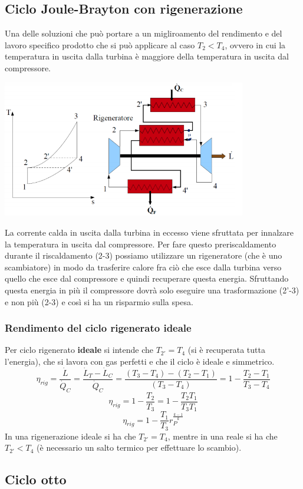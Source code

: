 \subsection{Ciclo Joule-Brayton con rigenerazione}
Una delle soluzioni che può portare a un migliroamento del rendimento e del lavoro specifico prodotto che si può applicare al caso $T_2<T_4$, ovvero in cui la temperatura in uscita dalla turbina è maggiore della temperatura in uscita dal compressore.
\begin{center}
    \includegraphics[height=6cm]{../L07/img8.PNG}
\end{center}
La corrente calda in uscita dalla turbina in eccesso viene sfruttata per innalzare la temperatura in uscita dal compressore.\newline
\newline
Per fare questo preriscaldamento durante il riscaldamento (2-3) possiamo utilizzare un rigeneratore (che è uno scambiatore) in modo da trasferire calore fra ciò che esce dalla turbina verso quello che esce dal compressore e quindi recuperare questa energia. Sfruttando questa energia in più il compressore dovrà solo eseguire una trasformazione (2'-3) e non più (2-3) e così si ha un risparmio sulla spesa.\newline
\newline
\subsubsection{Rendimento del ciclo rigenerato ideale}
Per ciclo rigenerato \textbf{ideale} si intende che $T_{2'} = T_4$ (si è recuperata tutta l'energia), che si lavora con gas perfetti e che il ciclo è ideale e simmetrico.
\[
    \eta_{rig} = \frac{\dot{L}}{\dot{Q}_C} = \frac{\dot{L}_T - \dot{L}_C}{\dot{Q}_C} = \frac{(T_3-T_4)-(T_2-T_1)}{(T_3-T_4)} = 1- \frac{T_2-T_1}{T_3-T_4}
\]
\[
    \eta_{rig} = 1- \frac{T_2}{T_3} = 1- \frac{T_2 T_1}{T_3T_1}
\]
\[
    \eta_{rig} = 1- \frac{T_1}{T_3}r_P^{\frac{k-1}{k}}
\]
In una rigenerazione ideale si ha che $T_{2'}=T_4$, mentre in una reale si ha che $T_{2'} < T_4$ (è necessario un salto termico per effettuare lo scambio).
\subsection{Ciclo otto}